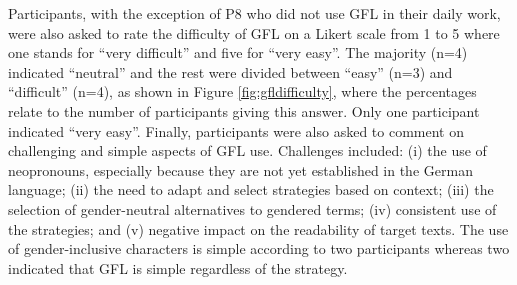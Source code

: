 \begin{table}
    \caption{Participants' profiles}
    \label{tab:dem}
\end{table}

Participants, with the exception of P8 who did not use GFL in their daily work, were also asked to rate the difficulty of GFL on a Likert scale from 1 to 5 where one stands for ``very difficult'' and five for ``very easy''. The majority (n=4) indicated ``neutral'' and the rest were divided between ``easy'' (n=3) and ``difficult'' (n=4), as shown in Figure \ref{fig:gfldifficulty}, where the percentages relate to the number of participants giving this answer. Only one participant indicated ``very easy''. Finally, participants were also asked to comment on challenging and simple aspects of GFL use. Challenges included: (i) the use of neopronouns, especially because they are not yet established in the German language; (ii) the need to adapt and select strategies based on context; (iii) the selection of gender-neutral alternatives to gendered terms; (iv) consistent use of the strategies; and (v) negative impact on the readability of target texts. The use of gender-inclusive characters is simple according to two participants whereas two indicated that GFL is simple regardless of the strategy. 

